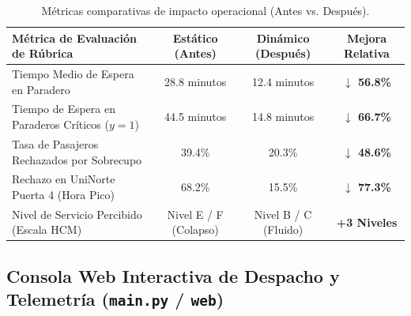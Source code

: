 \documentclass[11pt,letterpaper]{article}
\begin{document}
\begin{table}[H]
\centering
\caption{Métricas comparativas de impacto operacional (Antes vs. Después).}
\label{tab:impacto}
{\small
\begin{tabular}{lccc}
\toprule
\textbf{Métrica de Evaluación de Rúbrica} & \textbf{Estático (Antes)} & \textbf{Dinámico (Después)} & \textbf{Mejora Relativa} \\
\midrule
Tiempo Medio de Espera en Paradero & 28.8 minutos & 12.4 minutos & \textbf{$\downarrow$ 56.8\%} \\
Tiempo de Espera en Paraderos Críticos ($y=1$) & 44.5 minutos & 14.8 minutos & \textbf{$\downarrow$ 66.7\%} \\
Tasa de Pasajeros Rechazados por Sobrecupo & 39.4\% & 20.3\% & \textbf{$\downarrow$ 48.6\%} \\
Rechazo en UniNorte Puerta 4 (Hora Pico) & 68.2\% & 15.5\% & \textbf{$\downarrow$ 77.3\%} \\
Nivel de Servicio Percibido (Escala HCM) & Nivel E / F (Colapso) & Nivel B / C (Fluido) & \textbf{+3 Niveles} \\
\bottomrule
\end{tabular}
}
\end{table}

\subsection{Consola Web Interactiva de Despacho y Telemetría (\texttt{main.py} / \texttt{web})}
\end{document}
